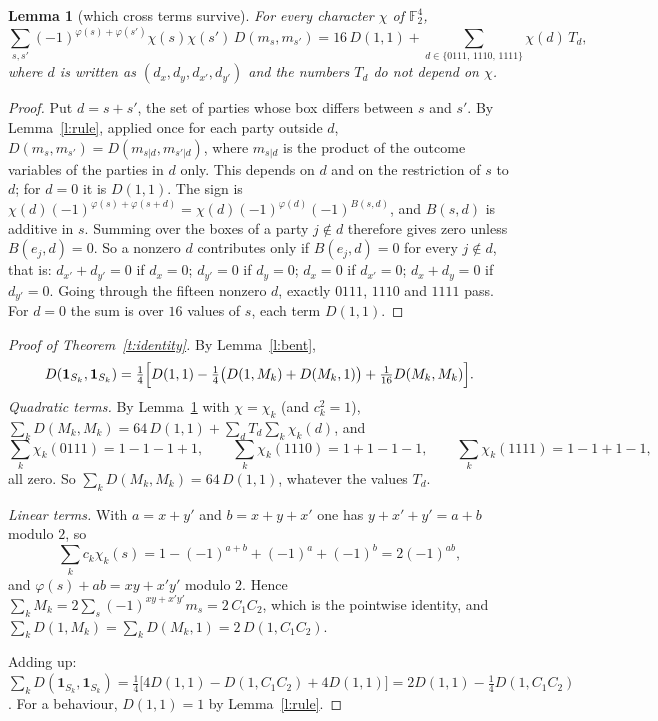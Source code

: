 \documentclass[11pt,a4paper]{article}
\newtheorem{lemma}[theorem]{Lemma}
\theoremstyle{definition}
\theoremstyle{remark}
\newcommand{\ind}[1]{\mathbf{1}_{#1}}
\newcommand{\F}{\mathbb{F}_2}
\begin{document}
\begin{lemma}[which cross terms survive]\label{l:survive}
For every character $\chi$ of $\F^4$,
\[
\sum_{s,s'}(-1)^{\varphi(s)+\varphi(s')}\chi(s)\chi(s')\,D(m_s,m_{s'})
=16\,D(1,1)+\sum_{d\in\{0111,\,1110,\,1111\}}\chi(d)\,T_d ,
\]
where $d$ is written as $(d_x,d_y,d_{x'},d_{y'})$ and the numbers $T_d$ do not depend on $\chi$.
\end{lemma}

\begin{proof}
Put $d=s+s'$, the set of parties whose box differs between $s$ and $s'$. By Lemma~\ref{l:rule}, applied
once for each party outside $d$, $D(m_s,m_{s'})=D(m_{s|d},m_{s'|d})$, where $m_{s|d}$ is the product of
the outcome variables of the parties in $d$ only. This depends on $d$ and on the restriction of $s$ to
$d$; for $d=0$ it is $D(1,1)$. The sign is $\chi(d)(-1)^{\varphi(s)+\varphi(s+d)}=
\chi(d)(-1)^{\varphi(d)}(-1)^{B(s,d)}$, and $B(s,d)$ is additive in $s$. Summing over the boxes of a
party $j\notin d$ therefore gives zero unless $B(e_j,d)=0$. So a nonzero $d$ contributes only if
$B(e_j,d)=0$ for every $j\notin d$, that is:
$d_{x'}+d_{y'}=0$ if $d_x=0$; $d_{y'}=0$ if $d_y=0$; $d_x=0$ if $d_{x'}=0$; $d_x+d_y=0$ if $d_{y'}=0$.
Going through the fifteen nonzero $d$, exactly $0111$, $1110$ and $1111$ pass. For $d=0$ the sum is over
$16$ values of $s$, each term $D(1,1)$.
\end{proof}

\begin{proof}[Proof of Theorem~\ref{t:identity}]
By Lemma~\ref{l:bent},
\[
D(\ind{S_k},\ind{S_k})=\tfrac14\Bigl[D(1,1)-\tfrac14\bigl(D(1,M_k)+D(M_k,1)\bigr)+\tfrac1{16}D(M_k,M_k)\Bigr].
\]
\emph{Quadratic terms.} By Lemma~\ref{l:survive} with $\chi=\chi_k$ (and $c_k^2=1$),
$\sum_kD(M_k,M_k)=64\,D(1,1)+\sum_dT_d\sum_k\chi_k(d)$, and
\[
\sum_k\chi_k(0111)=1-1-1+1,\qquad\sum_k\chi_k(1110)=1+1-1-1,\qquad\sum_k\chi_k(1111)=1-1+1-1 ,
\]
all zero. So $\sum_kD(M_k,M_k)=64\,D(1,1)$, whatever the values $T_d$.

\emph{Linear terms.} With $a=x+y'$ and $b=x+y+x'$ one has $y+x'+y'=a+b$ modulo $2$, so
\[
\sum_kc_k\chi_k(s)=1-(-1)^{a+b}+(-1)^a+(-1)^b=2(-1)^{ab},
\]
and $\varphi(s)+ab=xy+x'y'$ modulo $2$. Hence $\sum_kM_k=2\sum_s(-1)^{xy+x'y'}m_s=2\,C_1C_2$, which is the
pointwise identity, and $\sum_kD(1,M_k)=\sum_kD(M_k,1)=2\,D(1,C_1C_2)$.

Adding up: $\sum_kD(\ind{S_k},\ind{S_k})=\tfrac14\bigl[4D(1,1)-D(1,C_1C_2)+4D(1,1)\bigr]
=2D(1,1)-\tfrac14D(1,C_1C_2)$. For a behaviour, $D(1,1)=1$ by Lemma~\ref{l:rule}.
\end{proof}
\end{document}
